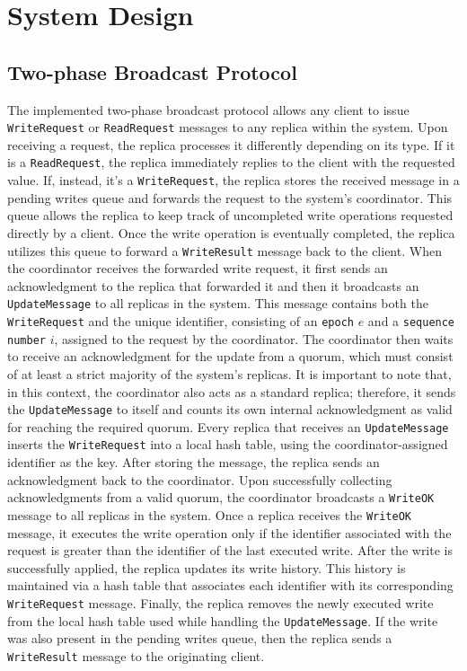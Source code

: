 \section{System Design}\label{sec:sys-design}
\subsection{Two-phase Broadcast Protocol}
The implemented two-phase broadcast protocol allows any client to issue \texttt{WriteRequest} or \texttt{ReadRequest} messages to any replica within the system.
Upon receiving a request, the replica processes it differently depending on its type. If it is a \texttt{ReadRequest}, the replica immediately replies to the client with the requested value.
If, instead, it's a \texttt{WriteRequest}, the replica stores the received message in a pending writes queue and forwards the request to the system's coordinator. This queue allows the replica to keep track of uncompleted write operations requested directly by a client. 
Once the write operation is eventually completed, the replica utilizes this queue to forward a \texttt{WriteResult} message back to the client.
When the coordinator receives the forwarded write request, it first sends an acknowledgment to the replica that forwarded it and then it broadcasts an \texttt{UpdateMessage} to all replicas in the system. This message contains both the \texttt{WriteRequest} and the unique identifier,  consisting of an \texttt{epoch} $e$ and a \texttt{sequence number} $i$, assigned to the request by the coordinator.
The coordinator then waits to receive an acknowledgment for the update from a quorum, which must consist of at least a strict majority of the system's replicas. 
It is important to note that, in this context, the coordinator also acts as a standard replica; therefore, it sends the \texttt{UpdateMessage} to itself and counts its own internal acknowledgment as valid for reaching the required quorum.
Every replica that receives an \texttt{UpdateMessage} inserts the \texttt{WriteRequest} into a local hash table, using the coordinator-assigned identifier as the key. After storing the message, the replica sends an acknowledgment back to the coordinator.
Upon successfully collecting acknowledgments from a valid quorum, the coordinator broadcasts a \texttt{WriteOK} message to all replicas in the system.
Once a replica receives the \texttt{WriteOK} message, it executes the write operation only if the identifier associated with the request is greater than the identifier of the last executed write.
After the write is successfully applied, the replica updates its write history. This history is maintained via a hash table that associates each identifier with its corresponding \texttt{WriteRequest} message.
Finally, the replica removes the newly executed write from the local hash table used while handling the \texttt{UpdateMessage}. If the write was also present in the pending writes queue, then the replica sends a \texttt{WriteResult} message to the originating client.

